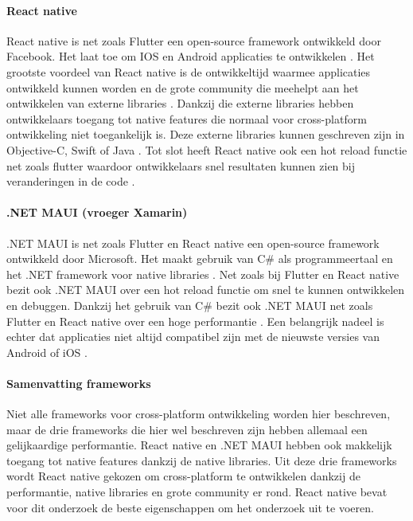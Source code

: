 \paragraph{React native}
React native is net zoals Flutter een open-source framework ontwikkeld door Facebook. 
Het laat toe om IOS en Android applicaties te ontwikkelen \autocite{Terekhov2022}. 
Het grootste voordeel van React native is de ontwikkeltijd waarmee applicaties ontwikkeld 
kunnen worden \autocite{Terekhov2022} en de grote community die meehelpt aan het ontwikkelen 
van externe libraries \autocite{Okeke2022a}. Dankzij die externe libraries hebben ontwikkelaars 
toegang tot native features die normaal voor cross-platform ontwikkeling niet toegankelijk is. 
Deze externe libraries kunnen geschreven zijn in Objective-C, Swift of Java \autocite{Okeke2022a}. 
Tot slot heeft React native ook een hot reload functie net zoals flutter waardoor ontwikkelaars 
snel resultaten kunnen zien bij veranderingen in de code \autocite{Terekhov2022}.

\paragraph{.NET MAUI (vroeger Xamarin)}
.NET MAUI is net zoals Flutter en React native een open-source framework ontwikkeld door 
Microsoft. Het maakt gebruik van C\# als programmeertaal en het .NET framework voor 
native libraries \autocite{Sakovich22023}. Net zoals bij Flutter en React native bezit 
ook .NET MAUI over een hot reload functie om snel te kunnen ontwikkelen en debuggen. 
Dankzij het gebruik van C\# bezit ook .NET MAUI net zoals Flutter en React native over 
een hoge performantie \autocite{Okeke2022a}. Een belangrijk nadeel is echter dat 
applicaties niet altijd compatibel zijn met de nieuwste versies van 
Android of iOS \autocite{Terekhov2022}.

\paragraph{Samenvatting frameworks}
Niet alle frameworks voor cross-platform ontwikkeling worden hier beschreven, maar de drie 
frameworks die hier wel beschreven zijn hebben allemaal een gelijkaardige performantie. React native en 
.NET MAUI hebben ook makkelijk toegang tot native features dankzij de native libraries. 
Uit deze drie frameworks wordt React native gekozen om cross-platform te ontwikkelen 
dankzij de performantie, native libraries en grote community er rond. React native 
bevat voor dit onderzoek de beste eigenschappen om het onderzoek uit te voeren.

